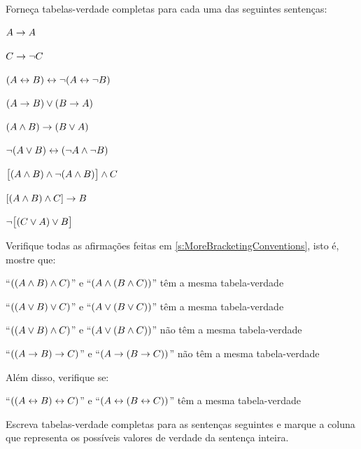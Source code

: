 \practiceproblems\label{pr.TT.TTorC}
\problempart
Forneça tabelas-verdade completas para cada uma das seguintes sentenças:
\begin{compactlist}
\item $A \rightarrow A$ %
\item $C \rightarrow\neg C$ %
\item $(A \leftrightarrow B) \leftrightarrow \neg(A\leftrightarrow \neg B)$ %
\item $(A \rightarrow B) \vee (B \rightarrow A)$ %
\item $(A \wedge B) \rightarrow (B \vee A)$  %
\item $\neg(A \vee B) \leftrightarrow (\neg A \wedge \neg B)$ %
\item $\bigl[(A\wedge B) \wedge\neg(A\wedge B)\bigr] \wedge C$ %
\item $[(A \wedge B) \wedge C] \rightarrow B$ %
\item $\neg\bigl[(C\vee A) \vee B\bigr]$ %
\end{compactlist}
\problempart
Verifique todas as afirmações feitas em \cref{s:MoreBracketingConventions}, isto é, mostre que:
\begin{compactlist}
	\item \textquotedblleft{}$((A \wedge B) \wedge C)$\textquotedblright{} e \textquotedblleft{}$(A \wedge (B \wedge C))$\textquotedblright{} têm a mesma tabela-verdade
	\item \textquotedblleft{}$((A \vee B) \vee C)$\textquotedblright{} e \textquotedblleft{}$(A \vee (B \vee C))$\textquotedblright{} têm a mesma tabela-verdade
	\item \textquotedblleft{}$((A \vee B) \wedge C)$\textquotedblright{} e \textquotedblleft{}$(A \vee (B \wedge C))$\textquotedblright{} não têm a mesma tabela-verdade
	\item \textquotedblleft{}$((A \rightarrow B) \rightarrow C)$\textquotedblright{} e \textquotedblleft{}$(A \rightarrow (B \rightarrow C))$\textquotedblright{} não têm a mesma tabela-verdade
\end{compactlist}
Além disso, verifique se:
\begin{compactlist}
	\item[5.] \textquotedblleft{}$((A \leftrightarrow B) \leftrightarrow C)$\textquotedblright{} e \textquotedblleft{}$(A \leftrightarrow (B \leftrightarrow C))$\textquotedblright{} têm a mesma tabela-verdade
\end{compactlist}

\problempart
Escreva tabelas-verdade completas para as sentenças seguintes e marque a coluna que representa os possíveis valores de verdade da sentença inteira.

